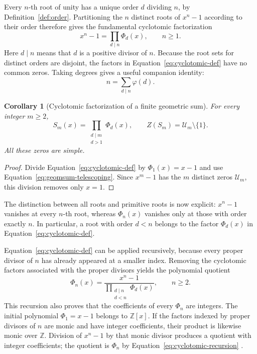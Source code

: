 \documentclass[11pt,a4paper]{article}
\numberwithin{equation}{section}
\theoremstyle{uprightpaper}
\newtheorem{corollary}{Corollary}[section]
\begin{document}
Every $n$-th root of unity has a unique order $d$ dividing $n$,
by Definition~\ref{def:order}. Partitioning the $n$ distinct roots of
$x^n-1$ according to their order therefore gives the fundamental
cyclotomic factorization
\begin{equation}\label{eq:cyclotomic-def}
 x^n-1=\prod_{d\mid n}\Phi_d(x),\qquad n\geq1.
\end{equation}
Here $d\mid n$ means that $d$ is a positive divisor of $n$.
Because the root sets for distinct orders are disjoint, the factors
in Equation~\eqref{eq:cyclotomic-def} have no common zeros. Taking
degrees gives a useful companion identity:
\begin{equation}\label{eq:totient-divisor-sum}
 n=\sum_{d\mid n}\varphi(d).
\end{equation}
\begin{corollary}[Cyclotomic factorization of a finite geometric sum]\label{cor:geomsum-cyclotomic}
For every integer $m\ge2$,
\begin{equation}\label{eq:geomsum-cyclotomic}
 S_m(x)=\prod_{\substack{d\mid m\\ d>1}}\Phi_d(x),
 \qquad Z(S_m)=\mathcal U_m\setminus\{1\}.
\end{equation}
All these zeros are simple.
\end{corollary}
\begin{proof}
Divide Equation~\eqref{eq:cyclotomic-def} by $\Phi_1(x)=x-1$ and use Equation~\eqref{eq:geomsum-telescoping}. Since $x^m-1$ has the $m$ distinct zeros $\mathcal U_m$, this division removes only $x=1$.
\end{proof}
The distinction between all roots and primitive roots is now explicit:
$x^n-1$ vanishes at every $n$-th root, whereas $\Phi_n(x)$ vanishes
only at those with order exactly $n$. In particular, a root with order
$d<n$ belongs to the factor $\Phi_d(x)$ in
Equation~\eqref{eq:cyclotomic-def}.

Equation~\eqref{eq:cyclotomic-def} can be applied recursively, because
every proper divisor of $n$ has already appeared at a smaller index.
Removing the cyclotomic factors associated with the proper divisors
yields the polynomial quotient
\begin{equation}\label{eq:cyclotomic-recursion}
 \Phi_n(x)=\frac{x^n-1}
 {\displaystyle\prod_{\substack{d\mid n\\d<n}}\Phi_d(x)},\qquad n\geq2.
\end{equation}
This recursion also proves that the coefficients of every
$\Phi_n$ are integers. The initial polynomial $\Phi_1=x-1$ belongs
to $\mathbb Z[x]$. If the factors indexed by proper divisors of $n$
are monic and have integer coefficients, their product is likewise
monic over $\mathbb Z$. Division of $x^n-1$ by that monic divisor
produces a quotient with integer coefficients; the quotient is
$\Phi_n$ by Equation~\eqref{eq:cyclotomic-recursion}
\cite[Section~13.6]{dummit2004}.
\end{document}

